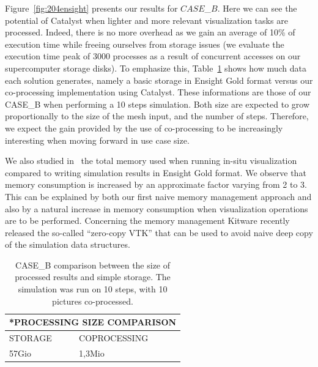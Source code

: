 Figure~\ref{fig:204ensight}
presents our results for $CASE$\_$B$. Here we can see the potential of Catalyst
when 
lighter and more relevant visualization tasks are processed. Indeed, there is no more 
overhead as we gain an average of 10\% of execution time while freeing
ourselves from storage issues (we evaluate the execution time peak of
3000 processes as a result of concurrent accesses on our 
supercomputer storage disks). To emphasize this, Table~\ref{fig:size_tab} shows how much data each
solution generates, namely a basic storage in Ensight Gold format versus our
co-processing implementation using Catalyst. These informations are those of our
CASE\_B when performing a 10 steps simulation. Both size are
expected to grow proportionally to the size of the mesh input, and the number of
steps. Therefore, we expect the gain provided by the use of co-processing 
to be increasingly interesting when moving forward in use case size.

We also studied in~\cite{6675158} the total memory used when running in-situ
visualization compared to writing simulation results in Ensight Gold
format. We observe that memory consumption is
increased by an approximate factor varying from 2 to 3. This can be explained by
both our first naive memory management approach and also by a natural increase
in memory consumption when visualization operations are to be performed.
Concerning the memory management Kitware recently released the so-called ``zero-copy
VTK'' that can be used to avoid naive deep copy of the simulation data structures.

\begin{table}[!h]
\centering
\begin{tabular}{|p{3.5cm}|p{3.5cm}|}
\hline
\multicolumn{2}{|c|}{\textbf{*PROCESSING SIZE COMPARISON}}\\
\hline
STORAGE & COPROCESSING \\
\hline 
57Gio & 1,3Mio \\
\hline 
\end{tabular} 
\caption{CASE\_B comparison between the size of processed results and simple storage. The simulation was run on 10 steps, with 10
pictures co-processed.}
\label{fig:size_tab}
\end{table}

